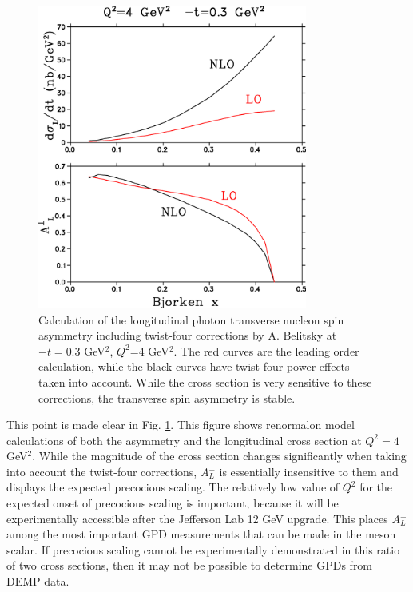 \begin{figure}[hbt!]
\begin{center}
\includegraphics[height=10cm]{./figures/belitsky2.png}
\end{center}
\caption{\label{fig:belitsky_atpi}
Calculation of the longitudinal photon transverse nucleon spin asymmetry
including twist-four corrections by A. Belitsky \cite{belitsky} at $-t=0.3$
GeV$^2$, $Q^2$=4 GeV$^2$.  The red curves are the leading order calculation,
while the black curves have twist-four power effects taken into account.  While
the cross section is very sensitive to these corrections, the transverse spin
asymmetry is stable.}
\end{figure}

This point is made clear in Fig. \ref{fig:belitsky_atpi}.  This figure shows
renormalon model calculations \cite{belitsky} of both the asymmetry and the
longitudinal cross section at $Q^2=4$ GeV$^2$.  While the magnitude of the
cross section changes significantly when taking into account the twist-four
corrections, $A_L^{\perp}$ is essentially insensitive to them and displays the
expected precocious scaling.  The relatively low value of $Q^2$ for the
expected onset of precocious scaling is important, because it will be
experimentally accessible after the Jefferson Lab 12 GeV upgrade.  This places
$A_L^{\perp}$ among the most important GPD measurements that can be made in the
meson scalar.  If precocious scaling cannot be experimentally demonstrated in
this ratio of two cross sections, then it may not be possible to determine
GPDs from DEMP data.

